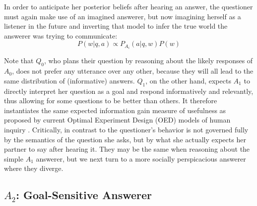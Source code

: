 \documentclass[11pt, floatsintext]{apa6}
\newcommand{\ndg}[1]{\textcolor{Green}{[ndg: #1]}}
\begin{document}
In order to anticipate her posterior beliefs after hearing an answer, the questioner must again make use of an imagined answerer, but now imagining herself as a listener in the future and inverting that model to infer the true world the answerer was trying to communicate:
$$P(w|q,a) \propto P_{A_i}(a| q, w)P(w)$$

Note that $Q_0$, who plans their question by reasoning about the likely responses of $A_0$, does not prefer any utterance over any other, because they will all lead to the same distribution of (informative) answers. $Q_1$, on the other hand, expects $A_1$ to directly interpret her question as a goal and respond informatively and relevantly, thus allowing for some questions to be better than others. It therefore instantiates the same expected information gain measure of usefulness as proposed by current Optimal Experiment Design (OED) models of human inquiry \cite{coenen2018asking}. Critically, in contrast to  the questioner's behavior is not governed fully by the semantics of the question she asks, but by what she actually expects her partner to say after hearing it. They may be the same when reasoning about the simple $A_1$ answerer, but we next turn to a more socially perspicacious answerer where they diverge.

\subsection{$A_2$: Goal-Sensitive Answerer}

%

\end{document}
